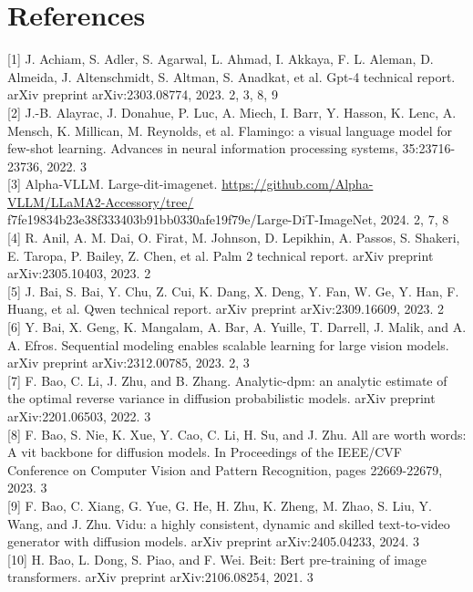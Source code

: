 \documentclass{article}
\begin{document}
\section*{References}
[1] J. Achiam, S. Adler, S. Agarwal, L. Ahmad, I. Akkaya, F. L. Aleman, D. Almeida, J. Altenschmidt, S. Altman, S. Anadkat, et al. Gpt-4 technical report. arXiv preprint arXiv:2303.08774, 2023. 2, 3, 8, 9\\[0pt]
[2] J.-B. Alayrac, J. Donahue, P. Luc, A. Miech, I. Barr, Y. Hasson, K. Lenc, A. Mensch, K. Millican, M. Reynolds, et al. Flamingo: a visual language model for few-shot learning. Advances in neural information processing systems, 35:23716-23736, 2022. 3\\[0pt]
[3] Alpha-VLLM. Large-dit-imagenet. \href{https://github.com/Alpha-VLLM/LLaMA2-Accessory/tree/}{https://github.com/Alpha-VLLM/LLaMA2-Accessory/tree/} f7fe19834b23e38f333403b91bb0330afe19f79e/Large-DiT-ImageNet, 2024. 2, 7, 8\\[0pt]
[4] R. Anil, A. M. Dai, O. Firat, M. Johnson, D. Lepikhin, A. Passos, S. Shakeri, E. Taropa, P. Bailey, Z. Chen, et al. Palm 2 technical report. arXiv preprint arXiv:2305.10403, 2023. 2\\[0pt]
[5] J. Bai, S. Bai, Y. Chu, Z. Cui, K. Dang, X. Deng, Y. Fan, W. Ge, Y. Han, F. Huang, et al. Qwen technical report. arXiv preprint arXiv:2309.16609, 2023. 2\\[0pt]
[6] Y. Bai, X. Geng, K. Mangalam, A. Bar, A. Yuille, T. Darrell, J. Malik, and A. A. Efros. Sequential modeling enables scalable learning for large vision models. arXiv preprint arXiv:2312.00785, 2023. 2, 3\\[0pt]
[7] F. Bao, C. Li, J. Zhu, and B. Zhang. Analytic-dpm: an analytic estimate of the optimal reverse variance in diffusion probabilistic models. arXiv preprint arXiv:2201.06503, 2022. 3\\[0pt]
[8] F. Bao, S. Nie, K. Xue, Y. Cao, C. Li, H. Su, and J. Zhu. All are worth words: A vit backbone for diffusion models. In Proceedings of the IEEE/CVF Conference on Computer Vision and Pattern Recognition, pages 22669-22679, 2023. 3\\[0pt]
[9] F. Bao, C. Xiang, G. Yue, G. He, H. Zhu, K. Zheng, M. Zhao, S. Liu, Y. Wang, and J. Zhu. Vidu: a highly consistent, dynamic and skilled text-to-video generator with diffusion models. arXiv preprint arXiv:2405.04233, 2024. 3\\[0pt]
[10] H. Bao, L. Dong, S. Piao, and F. Wei. Beit: Bert pre-training of image transformers. arXiv preprint arXiv:2106.08254, 2021. 3\\[0pt]
\end{document}
